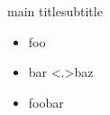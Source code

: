 \documentclass{beamer}
\begin{document}
\begin{frame}{main title}{subtitle}
\begin{itemize}[<+->]
    \item foo
    \item bar \only<.>{baz}
    \item foobar
\end{itemize}
\end{frame}
\end{document}
